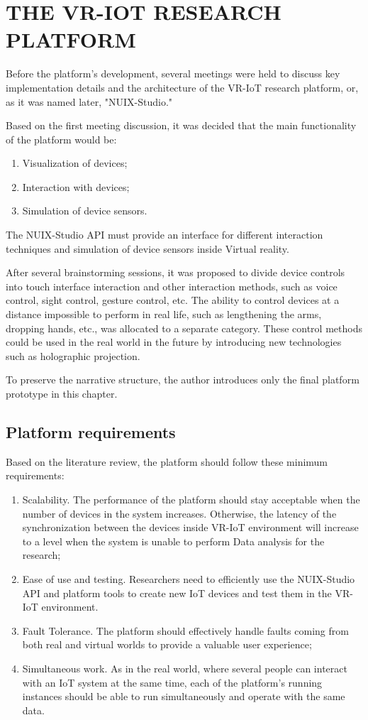 
\chapter{THE VR-IOT RESEARCH PLATFORM}

Before the platform's development, several meetings were held to discuss key implementation details and the architecture of the VR-IoT research platform, or, as it was named later, "NUIX-Studio."

Based on the first meeting discussion, it was decided that the main functionality of the platform would be:
\begin{enumerate}
     \item Visualization of devices;
     \item Interaction with devices;
     \item Simulation of device sensors.
\end{enumerate}

The NUIX-Studio API must provide an interface for different interaction techniques and simulation of device sensors inside Virtual reality.

After several brainstorming sessions, it was proposed to divide device controls into touch interface interaction and other interaction methods, such as voice control, sight control, gesture control, etc. The ability to control devices at a distance impossible to perform in real life, such as lengthening the arms, dropping hands, etc., was allocated to a separate category. These control methods could be used in the real world in the future by introducing new technologies such as holographic projection.

To preserve the narrative structure, the author introduces only the final platform prototype in this chapter.

\section{Platform requirements}
Based on the literature review, the platform should follow these minimum requirements:
\begin{enumerate}
\item Scalability. The performance of the platform should stay acceptable when the number of devices in the system increases. Otherwise, the latency of the synchronization between the devices inside VR-IoT environment will increase to a level when the system is unable to perform Data analysis for the research;
\item Ease of use and testing. Researchers need to efficiently use the NUIX-Studio API and platform tools to create new IoT devices and test them in the VR-IoT environment.
\item Fault Tolerance. The platform should effectively handle faults coming from both real and virtual worlds to provide a valuable user experience;
\item Simultaneous work. As in the real world, where several people can interact with an IoT system at the same time, each of the platform's running instances should be able to run simultaneously and operate with the same data.
\end{enumerate}

